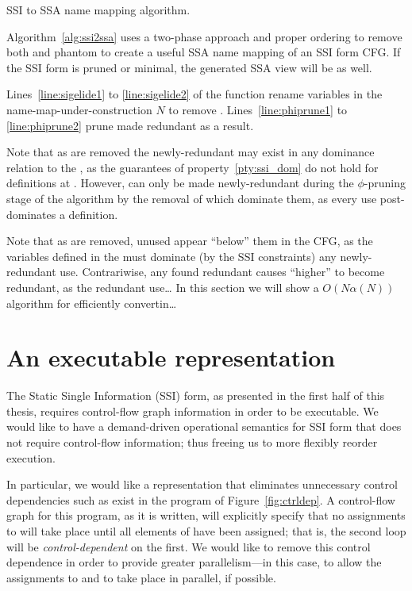 \documentclass[12pt,titlepage,twoside]{article}
\let\oldsection\section
\renewcommand{\section}{\setcounter{figure}{0}\setcounter{table}{0}\oldsection}
\begin{document}
{\begin{myalgorithm}\small

\caption{SSI to SSA name mapping algorithm.}
\label{alg:ssi2ssa}
\end{myalgorithm}
Algorithm~\ref{alg:ssi2ssa} uses a two-phase approach and proper
ordering to remove both  and phantom  to
create a useful SSA name mapping of an SSI form CFG.  If the SSI form
is pruned or minimal, the generated SSA view will be as well.

Lines~\ref{line:sigelide1} to \ref{line:sigelide2} of the
 function rename variables in the
name-map-under-construction $N$ to remove .
Lines~\ref{line:phiprune1} to \ref{line:phiprune2} prune
 made redundant as a result.

Note that as  are removed the newly-redundant
 may exist in any dominance relation to the
\sigfunction{}, as the guarantees of property~\ref{pty:ssi_dom} do not
hold for definitions at .  However,  can
only be made newly-redundant during the $\phi$-pruning stage of the
algorithm by the removal of  which dominate them, as
every use post-dominates a \phifunction{} definition.

Note that as  are removed, unused 
appear ``below'' them in the CFG, as the variables defined in the
\sigfunction{} must dominate (by the SSI constraints) any
newly-redundant use.  Contrariwise, any  found
redundant causes ``higher''  to become redundant, as
the redundant use\ldots
%
In this section we will show a $O(N\alpha(N))$ algorithm for
efficiently convertin\ldots %
} %

\section{An executable representation}\label{sec:ssiplus}
The Static Single Information (SSI) form, as presented in the first
half of this thesis,
requires control-flow graph information in order to be executable. We
would like to have a demand-driven operational semantics for SSI form
that does not require control-flow information; thus freeing us to
more flexibly reorder execution.

In particular, we would like a representation that eliminates
unnecessary control dependencies such as exist in the program of
Figure~\vref{fig:ctrldep}.  A control-flow graph for this program, as
it is written, will explicitly specify that no assignments to
 will take place until all elements of  have
been assigned; that is, the second loop will be
\emph{control-dependent} on the first.  We would like to remove this
control dependence in order to provide greater parallelism---in this
case, to allow the assignments to  and  to
take place in parallel, if possible.
\end{document}
